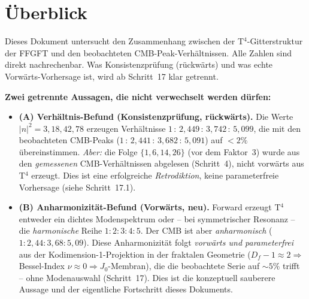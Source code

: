 %
%

\section*{Überblick}

Dieses Dokument untersucht den Zusammenhang zwischen der
T$^4$-Gitterstruktur der FFGFT und den beobachteten CMB-Peak-Verhältnissen.
Alle Zahlen sind direkt nachrechenbar. Was Konsistenzprüfung (rückwärts) und
was echte Vorwärts-Vorhersage ist, wird ab Schritt~17 klar getrennt.

\textbf{Zwei getrennte Aussagen, die nicht verwechselt werden dürfen:}
\begin{itemize}
  \item \textbf{(A) Verhältnis-Befund (Konsistenzprüfung, rückwärts).}
        Die Werte $|n|^2 = 3, 18, 42, 78$ erzeugen Verhältnisse
        $1\,:\,2{,}449\,:\,3{,}742\,:\,5{,}099$, die mit den beobachteten
        CMB-Peaks ($1\,:\,2{,}441\,:\,3{,}682\,:\,5{,}091$) auf $<2\%$
        übereinstimmen. \emph{Aber:} die Folge $\{1,6,14,26\}$ (vor dem
        Faktor~3) wurde aus den \emph{gemessenen} CMB-Verhältnissen
        abgelesen (Schritt~4), nicht vorwärts aus T$^4$ erzeugt. Dies ist
        eine erfolgreiche \emph{Retrodiktion}, keine parameterfreie
        Vorhersage (siehe Schritt~17.1).
  \item \textbf{(B) Anharmonizität-Befund (Vorwärts, neu).}
        Forward erzeugt T$^4$ entweder ein dichtes Modenspektrum oder --
        bei symmetrischer Resonanz -- die \emph{harmonische} Reihe
        $1:2:3:4:5$. Der CMB ist aber \emph{anharmonisch}
        ($1:2{,}44:3{,}68:5{,}09$). Diese Anharmonizität folgt
        \emph{vorwärts und parameterfrei} aus der Kodimension-1-Projektion
        in der fraktalen Geometrie ($D_f-1 \approx 2 \Rightarrow$
        Bessel-Index $\nu\approx0 \Rightarrow J_0$-Membran), die die
        beobachtete Serie auf $\sim5\%$ trifft -- ohne Modenauswahl
        (Schritt~17). Dies ist die konzeptuell sauberere Aussage und der
        eigentliche Fortschritt dieses Dokuments.
\end{itemize}

